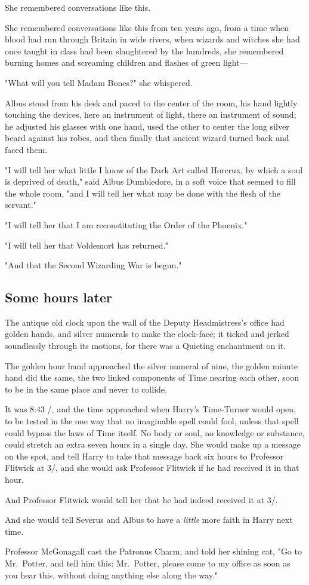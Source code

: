 She remembered conversations like this.

She remembered conversations like this from ten years ago, from a time when
blood had run through Britain in wide rivers, when wizards and witches she had
once taught in class had been slaughtered by the hundreds, she remembered
burning homes and screaming children and flashes of green light---

"What will you tell Madam Bones?" she whispered.

Albus stood from his desk and paced to the center of the room, his hand lightly
touching the devices, here an instrument of light, there an instrument of
sound; he adjusted his glasses with one hand, used the other to center the long
silver beard against his robes, and then finally that ancient wizard turned
back and faced them.

"I will tell her what little I know of the Dark Art called Horcrux, by which a
soul is deprived of death," said Albus Dumbledore, in a soft voice that seemed
to fill the whole room, "and I will tell her what may be done with the flesh of
the servant."

"I will tell her that I am reconstituting the Order of the Phoenix."

"I will tell her that Voldemort has returned."

"And that the Second Wizarding War is begun."
\sbreak
\vspace{-2\baselineskip}
\subsection{Some hours later{\el}}

The antique old clock upon the wall of the Deputy Headmistress's office had
golden hands, and silver numerals to make the clock-face; it ticked and jerked
soundlessly through its motions, for there was a Quieting enchantment on it.

The golden hour hand approached the silver numeral of nine, the golden minute
hand did the same, the two linked components of Time nearing each other, soon
to be in the same place and never to collide.

It was 8:43 \PM/, and the time approached when Harry's Time-Turner would open, to
be tested in the one way that no imaginable spell could fool, unless that spell
could bypass the laws of Time itself. No body or soul, no knowledge or
substance, could stretch an extra seven hours in a single day. She would make
up a message on the spot, and tell Harry to take that message back six hours to
Professor Flitwick at 3\PM/, and she would ask Professor Flitwick if he had
received it in that hour.

And Professor Flitwick would tell her that he had indeed received it at 3\PM/.

And she would tell Severus and Albus to have a \emph{little} more faith in
Harry next time.

Professor McGonagall cast the Patronus Charm, and told her shining cat, "Go to
Mr.~Potter, and tell him this: Mr.~Potter, please come to my office as soon as
you hear this, without doing anything else along the way."
